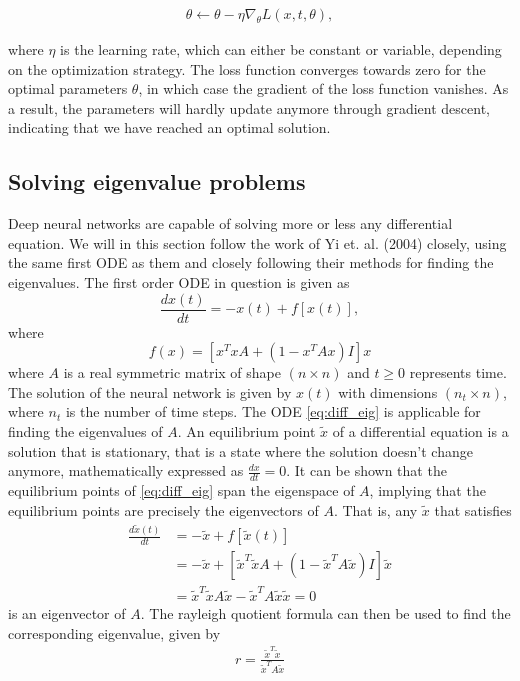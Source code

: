 \documentclass[12pt]{extarticle}
\begin{document}
\begin{align*}
	\theta \leftarrow \theta - \eta \nabla_{\theta}L(x,t,\theta),
\end{align*}

where $\eta$ is the learning rate, which can either be constant or variable, depending on the optimization strategy.
The loss function converges towards zero for the optimal parameters $\theta$, in which case the gradient of the loss function vanishes. As a result, the parameters will hardly update anymore through gradient descent, indicating that we have reached an optimal solution.


\subsection{Solving eigenvalue problems}
Deep neural networks are capable of solving more or less any differential equation. We will in this section follow the work of Yi et. al. (2004) \cite{yi2004neural} closely, using the same first ODE as them and closely following their methods for finding the eigenvalues. The first order ODE in question is given as     
\begin{equation}
	\frac{dx(t)}{dt} = -x(t) + f[x(t)],
	\label{eq:diff_eig}
\end{equation}
where
\[ f(x) = [x^TxA + (1 - x^TAx)I]x \]
where $A$ is a real symmetric matrix of shape $(n\times n)$ and $t \ge 0$ represents time. The solution of the neural network is given by $x(t)$ with dimensions $(n_t\times n)$, where $n_t$ is the number of time steps. The ODE \eqref{eq:diff_eig} is applicable for finding the eigenvalues of $A$. An equilibrium point $\tilde{x}$ of a differential equation is a solution that is stationary, that is a state where the solution doesn't change anymore, mathematically expressed as $\frac{dx}{dt} = 0$. It can be shown that the equilibrium points of \eqref{eq:diff_eig} span the eigenspace of $A$, implying that the equilibrium points are precisely the eigenvectors of $A$. That is, any $\tilde{x}$ that satisfies
\begin{align*}
	\frac{d\tilde{x}(t)}{dt} &= -\tilde{x} + f[\tilde{x}(t)] \\
	&= -\tilde{x} + [\tilde{x}^T\tilde{x}A + (1 - \tilde{x}^TA\tilde{x})I]\tilde{x} \\
	&= \tilde{x}^T\tilde{x}A\tilde{x} - \tilde{x}^TA\tilde{x}\tilde{x} = 0
\end{align*}
is an eigenvector of $A$. The rayleigh quotient formula can then be used to find the corresponding eigenvalue, given by
\begin{align} \label{eq:rayleigh_quotient}
	r = \frac{\tilde{x}^T\tilde{x}}{\tilde{x}^T A \tilde{x}}
\end{align}
\end{document}
